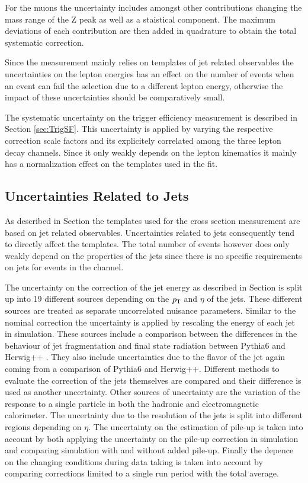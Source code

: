 For the muons the uncertainty includes amongst other contributions changing the mass range of the Z peak as well as a staistical component. The maximum deviations of each contribution are then added in quadrature to obtain the total systematic correction.

Since the measurement mainly relies on templates of jet related observables the uncertainties on the lepton energies has an effect on the number of events when an event can fail the selection
due to a different lepton energy, otherwise the impact of these uncertainties should be comparatively small.

The systematic uncertainty on the trigger efficiency measurement is described in Section \ref{sec:TrigSF}. This uncertainty is applied by varying the respective correction scale factors
and its explicitely correlated among the three lepton decay channels. Since it only weakly depends on the lepton kinematics it mainly has a normalization effect on the templates used in the fit.

\subsection{Uncertainties Related to Jets}

As described in Section  the templates used for the cross section measurement are based on jet related observables.
Uncertainties related to jets consequently tend to directly affect the templates. The total number of events however does only weakly depend on the properties of the jets
since there is no specific requirements on jets for events in the \emu channel.

The uncertainty on the correction of the jet energy as described in Section  is split up into 19 different sources depending on the $p_{\mathrm{T}}$ and $\eta$ of the jets.
These different sources are treated as separate uncorrelated nuisance parameters.
Similar to the nominal correction the uncertainty is applied by rescaling the energy of each jet in simulation.
These sources include a comparison between the differences in the behaviour of jet fragmentation and final state radiation between Pythia6 and Herwig++ .
They also include uncertainties due to the flavor of the jet again coming from a comparison of Pythia6 and Herwig++.
Different methods to evaluate the correction of the jets themselves are compared and their difference is used as another uncertainty.
Other sources of uncertainty are the variation of the response to a single particle in both the hadronic and electromagnetic calorimeter.
The uncertainty due to the resolution of the jets is split into different regions depending on $\eta$.
The uncertainty on the estimation of pile-up is taken into account by both applying the uncertainty on the pile-up correction in simulation and comparing simulation with and without added pile-up.
Finally the depence on the changing conditions during data taking is taken into account by comparing corrections limited to a single run period with the total average.

